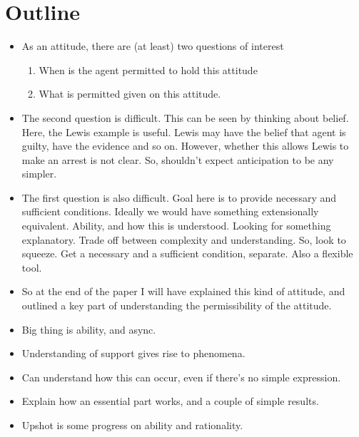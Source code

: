 \documentclass[10pt]{article}
\newcommand{\hozlinedash}[0]{%
  \noindent\hdashrule[0.5ex][c]{\textwidth}{.1pt}{2.5pt}
}
\begin{document}
\hozlinedash


\section*{Outline}
\label{sec:outline}


\begin{itemize}
\item As an attitude, there are (at least) two questions of interest
  \begin{enumerate}
  \item When is the agent permitted to hold this attitude
  \item What is permitted given on this attitude.
  \end{enumerate}
\item The second question is difficult.
  This can be seen by thinking about belief.
  Here, the Lewis example is useful.
  Lewis may have the belief that agent is guilty, have the evidence and so on.
  However, whether this allows Lewis to make an arrest is not clear.
  So, shouldn't expect anticipation to be any simpler.
\item The first question is also difficult.
  Goal here is to provide necessary and sufficient conditions.
  Ideally we would have something extensionally equivalent.
  Ability, and how this is understood.
  Looking for something explanatory.
  Trade off between complexity and understanding.
  So, look to squeeze.
  Get a necessary and a sufficient condition, separate.
  Also a flexible tool.
\item So at the end of the paper I will have explained this kind of attitude, and outlined a key part of understanding the permissibility of the attitude.
\item Big thing is ability, and async.
\end{itemize}

\begin{itemize}
\item Understanding of support gives rise to phenomena.
\item Can understand how this can occur, even if there's no simple expression.
\item Explain how an essential part works, and a couple of simple results.
\item Upshot is some progress on ability and rationality.
\end{itemize}
\end{document}

